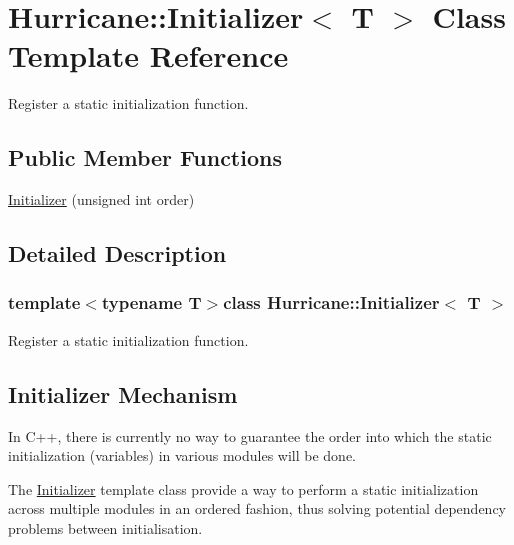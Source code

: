 \hypertarget{classHurricane_1_1Initializer}{\section{Hurricane\-:\-:Initializer$<$ T $>$ Class Template Reference}
\label{classHurricane_1_1Initializer}
}


Register a static initialization function.  


\subsection*{Public Member Functions}
\begin{DoxyCompactItemize}
\item 
\hyperlink{classHurricane_1_1Initializer_ab80fdb7c17aaf5bd3facdf3f0f9d12ae}{Initializer} (unsigned int order)
\end{DoxyCompactItemize}


\subsection{Detailed Description}
\subsubsection*{template$<$typename T$>$class Hurricane\-::\-Initializer$<$ T $>$}

Register a static initialization function. 

\hypertarget{classHurricane_1_1Initializer_secInitializerMechanism}{}\subsection{Initializer Mechanism}\label{classHurricane_1_1Initializer_secInitializerMechanism}
In C++, there is currently no way to guarantee the order into which the static initialization (variables) in various modules will be done.

The \hyperlink{classHurricane_1_1Initializer}{Initializer} template class provide a way to perform a static initialization across multiple modules in an ordered fashion, thus solving potential dependency problems between initialisation. 

